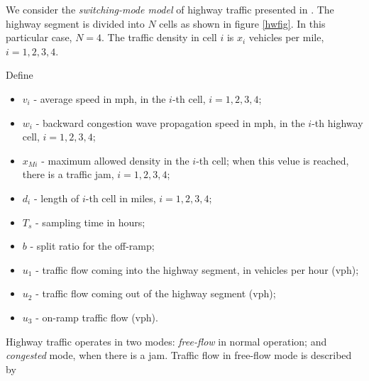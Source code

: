 We  consider the {\it switching-mode model} of highway traffic
presented in \cite{MUNOZ_SUN_HOROWITZ_ALVAREZ_DENSITY_ESTIMATION_WITH_THE_CELL_MODEL}. The highway segment is divided into $N$ cells
as shown in figure \ref{hwfig}. In this particular case, $N=4$.
The traffic density in cell $i$ is  $x_i$ vehicles per mile, $i=1,2,3,4$.

Define
\begin{itemize}
\item $v_i$ - average  speed in mph,
in the $i$-th cell, $i=1,2,3,4$;
\item $w_i$ - backward congestion wave propagation speed in mph,
in the $i$-th highway cell, $i=1,2,3,4$;
\item $x_{Mi}$ - maximum allowed density in the $i$-th cell;
when this velue is reached, there is a traffic jam, $i=1,2,3,4$;
\item $d_i$ - length of $i$-th cell in miles, $i=1,2,3,4$;
\item $T_s$ - sampling time in hours;
\item $b$ - split ratio for the off-ramp;
\item $u_1$ - traffic flow coming into the highway segment,
in vehicles per hour (vph);
\item $u_2$ - traffic flow coming out of the highway segment (vph);
\item $u_3$ - on-ramp traffic flow (vph).
\end{itemize}
Highway traffic operates in two modes: {\it free-flow} in normal operation;
and {\it congested} mode, when there is a jam.
Traffic flow in free-flow mode is described by
